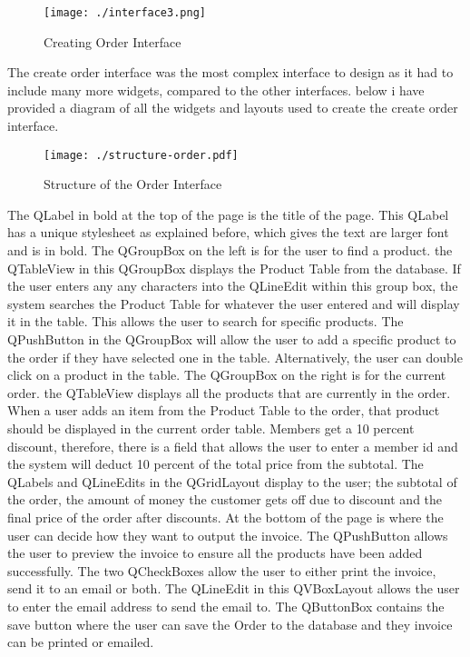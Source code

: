 \begin{figure}[H]
    \texttt{[image: ./interface3.png]}
    \caption{Creating Order Interface} \label{fig:creating-order-interface}
\end{figure}

The create order interface was the most complex interface to design as it had to include many more widgets, compared to the other interfaces. below i have provided a diagram of all the widgets and layouts used to create the create order interface.

\begin{figure}[H]
    \texttt{[image: ./structure-order.pdf]}
    \caption{Structure of the Order Interface} \label{fig:structure-order}
\end{figure}

The QLabel in bold at the top of the page is the title of the page. This QLabel has a unique stylesheet as explained before, which gives the text are larger font and is in bold. The QGroupBox on the left is for the user to find a product. the QTableView in this QGroupBox displays the Product Table from the database. If the user enters any any characters into the QLineEdit within this group box, the system searches the Product Table for whatever the user entered and will display it in the table. This allows the user to search for specific products. The QPushButton in the QGroupBox will allow the user to add a specific product to the order if they have selected one in the table. Alternatively, the user can double click on a product in the table. The QGroupBox on the right is for the current order. the QTableView displays all the products that are currently in the order. When a user adds an item from the Product Table to the order, that product should be displayed in the current order table. Members get a 10 percent discount, therefore, there is a field that allows the user to enter a member id and the system will deduct 10 percent of the total price from the subtotal. The QLabels and QLineEdits in the QGridLayout display to the user; the subtotal of the order, the amount of money the customer gets off due to discount and the final price of the order after discounts. At the bottom of the page is where the user can decide how they want to output the invoice. The QPushButton allows the user to preview the invoice to ensure all the products have been added successfully. The two QCheckBoxes allow the user to either print the invoice, send it to an email or both. The QLineEdit in this QVBoxLayout allows the user to enter the email address to send the email to. The QButtonBox contains the save button where the user can save the Order to the database and they invoice can be printed or emailed.

